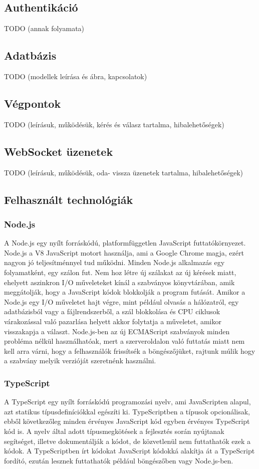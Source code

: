 \documentclass{elteikthesis}
\begin{document}
			\subsection{Authentikáció}
			TODO (annak folyamata)
			
			\subsection{Adatbázis}
			TODO (modellek leírása és ábra, kapcsolatok)
			
			\subsection{Végpontok}
			TODO (leírásuk, működésük, kérés és válasz tartalma, hibalehetőségek)
			
			\subsection{WebSocket üzenetek}
			TODO (leírásuk, működésük, oda- vissza üzenetek tartalma, hibalehetőségek)
			
			\subsection{Felhasznált technológiák}				
				\subsubsection{Node.js}
					A Node.js \cite{nodejs} egy nyílt forráskódú, platformfüggetlen JavaScript futtatókörnyezet. Node.js a V8 JavaScript motort használja, ami a Google Chrome magja, ezért nagyon jó teljesítménnyel tud működni. Minden Node.js alkalmazás egy folyamatként, egy szálon fut. Nem hoz létre új szálakat az új kérések miatt, ehelyett aszinkron I/O műveleteket kínál a szabványos könyvtárában, amik meggátolják, hogy a JavaScript kódok blokkolják a program futását. Amikor a Node.js egy I/O műveletet hajt végre, mint például olvasás a hálózatról, egy adatbázisból vagy a fájlrendszerből, a szál blokkolása és CPU ciklusok várakozással való pazarlása helyett akkor folytatja a műveletet, amikor visszakapja a választ. Node.js-ben az új ECMAScript szabványok minden probléma nélkül használhatóak, mert a szerveroldalon való futtatás miatt nem kell arra várni, hogy a felhasználók frissítsék a böngészőjüket, rajtunk múlik hogy a szabvány melyik verzióját szeretnénk használni.
				
				\subsubsection{TypeScript}
					A TypeScript \cite{typescript} egy nyílt forráskódú programozási nyelv, ami JavaScripten alapul, azt statikus típusdefiníciókkal egészíti ki. TypeScriptben a típusok opcionálisak, ebből következőleg minden érvényes JavaScript kód egyben érvényes TypeScript kód is. A nyelv által adott típusmegkötések a fejlesztés során nyújtanak segítséget, illetve dokumentálják a kódot, de közvetlenül nem futtathatók ezek a kódok. A TypeScriptben írt kódokat JavaScript kódokká alakítja át a TypeScript fordító, ezután lesznek futtathatók például böngészőben vagy Node.js-ben.
				
\end{document}
